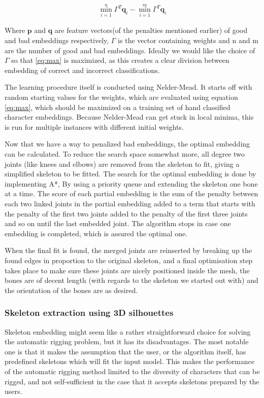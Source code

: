 \documentclass{article}
\begin{document}
\begin{align}
    \min^n_{i = 1} \Gamma^{T} \textbf{q}_i - \min^m_{i = 1} \Gamma^{T}
    \textbf{q}_i  \label{eq:max}
\end{align}

Where $\textbf{p}$ and $\textbf{q}$ are feature vectors(of the penalties
mentioned earlier) of good and bad
embeddings respectively, $\Gamma$ is the vector containing weights and n and m
are the number of good and bad embeddings.
Ideally we would like the choice of $\Gamma$ so that \ref{eq:max} is maximized, 
as this creates a clear division between embedding of correct and incorrect classifications. 

The learning procedure itself is conducted using Nelder-Mead. It starts off with
random starting values for the weights, which are evaluated using equation
\ref{eq:max}, which should be maximized on a training set of hand classified
character embeddings. 
Because Nelder-Mead can get stuck in
local minima, this is run for multiple instances with different initial weights.

Now that we have a way to penalized bad embeddings, the optimal embedding can
 be calculated. To reduce the search space somewhat more, all degree two joints
 (like knees and elbows) are removed from the
skeleton to fit, giving a simplified skeleton to be fitted. The search for the
optimal embedding is done by implementing A*, By using a priority
queue and extending the skeleton one bone at a time. The score of each partial
embedding is the sum of the penalty between each two linked joints in the
partial embedding added to a term that starts with the penalty of the first two
joints added to the penalty of the first three joints and so on until the
last embedded joint. The algorithm stops in case
one embedding is completed, which is assured the optimal one.

When the final fit is found, the merged joints are reinserted by breaking up the
found edges in proportion to the original skeleton, and a final optimisation
step takes place to make sure these joints are nicely positioned inside the
mesh, the bones are of decent length (with regards to the skeleton we started
out with) and the orientation of the bones are as desired.

\subsubsection{Skeleton extraction using 3D silhouettes} Skeleton embedding
might seem like a rather straightforward choice for solving the automatic
rigging problem, but it has its disadvantages. The most notable one is that it
makes the assumption that the user, or the algorithm itself, has predefined
skeletons which will fit the input model. This makes the performance of the
automatic rigging method limited to the diversity of characters that can be
rigged, and not self-sufficient in the case that it accepts skeletons prepared
by the users. 
\end{document}
